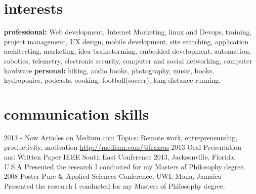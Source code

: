\documentclass[]{friggeri-cv} %
\begin{document}

\section{interests}

\textbf{professional:} Web development, Internet Marketing, linux and Devops, training, project management, UX design, mobile development, site searching, application architecting, marketing, idea brainstorming, embedded development, automation, robotics, telemetry, electronic security, computer and social networking, computer hardware
\textbf{personal:} hiking, audio books, photography, music, books, hydroponics, podcasts, cooking, football(soccer), long-distance running.




\newpage
\section{communication skills}

\begin{entrylist}

\entry
{2013 - Now}
{Articles on Medium.com}
{Topics: Remote work, entrepreneurship, productivity, motivation}
{\href{http://medium.com/@frazras}{http://medium.com/@frazras}}
\entry
{2013}
{Oral Presentation and Written Paper}
{IEEE South East Conference 2013, Jacksonville, Florida, U.S.A}
{Presented the research I conducted for my Masters of Philosophy degree.}
\entry
{2008}
{Poster}
{Pure \& Applied Sciences Conference, UWI, Mona, Jamaica}
{Presented the research I conducted for my Masters of Philosophy degree.}
\end{entrylist}
\end{document}

